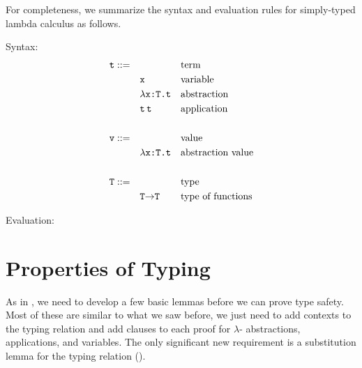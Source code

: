 \documentclass[11pt,twoside=off,numbers=noenddot]{scrbook}
\begin{document}
For completeness, we summarize the syntax and evaluation rules for
simply-typed lambda calculus as follows.

Syntax:
\begin{align*}
  \ttt{t} ::= & \quad && \text{term} \\
  & \quad \ttt{x} && \text{variable} \\
  & \quad \ttt{$\lambda$x:T.t} && \text{abstraction} \\
  & \quad \ttt{t\,t} && \text{application} \\
  \\
  \ttt{v} ::= & \quad && \text{value} \\
  & \quad \ttt{$\lambda$x:T.t} && \text{abstraction value} \\
  \\
  \ttt{T} ::= & \quad && \text{type} \\
  & \quad \ttt{T$\rightarrow$T} && \text{type of functions}
\end{align*}

Evaluation:
\begin{prooftree}
\end{prooftree}

\begin{prooftree}
\end{prooftree}

\begin{prooftree}
\end{prooftree}

\section{Properties of Typing}
As in , we need to develop a few
basic lemmas before we can prove type safety. Most of these are
similar to what we saw before, we just need to add contexts to the
typing relation and add clauses to each proof for $\lambda$-
abstractions, applications, and variables. The only significant new
requirement is a substitution lemma for the typing relation
().
\end{document}
